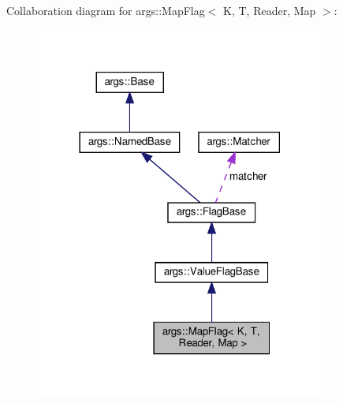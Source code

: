 Collaboration diagram for args\+:\+:Map\+Flag$<$ K, T, Reader, Map $>$\+:\nopagebreak
\begin{figure}[H]
\begin{center}
\leavevmode
\includegraphics[width=270pt]{classargs_1_1_map_flag__coll__graph}
\end{center}
\end{figure}
